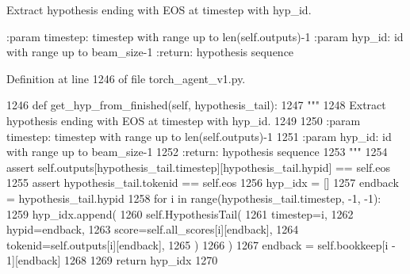 \begin{DoxyVerb}Extract hypothesis ending with EOS at timestep with hyp_id.

:param timestep: timestep with range up to len(self.outputs)-1
:param hyp_id: id with range up to beam_size-1
:return: hypothesis sequence
\end{DoxyVerb}
 

Definition at line 1246 of file torch\+\_\+agent\+\_\+v1.\+py.


\begin{DoxyCode}
1246     \textcolor{keyword}{def }get\_hyp\_from\_finished(self, hypothesis\_tail):
1247         \textcolor{stringliteral}{"""}
1248 \textcolor{stringliteral}{        Extract hypothesis ending with EOS at timestep with hyp\_id.}
1249 \textcolor{stringliteral}{}
1250 \textcolor{stringliteral}{        :param timestep: timestep with range up to len(self.outputs)-1}
1251 \textcolor{stringliteral}{        :param hyp\_id: id with range up to beam\_size-1}
1252 \textcolor{stringliteral}{        :return: hypothesis sequence}
1253 \textcolor{stringliteral}{        """}
1254         \textcolor{keyword}{assert} self.outputs[hypothesis\_tail.timestep][hypothesis\_tail.hypid] == self.eos
1255         \textcolor{keyword}{assert} hypothesis\_tail.tokenid == self.eos
1256         hyp\_idx = []
1257         endback = hypothesis\_tail.hypid
1258         \textcolor{keywordflow}{for} i \textcolor{keywordflow}{in} range(hypothesis\_tail.timestep, -1, -1):
1259             hyp\_idx.append(
1260                 self.HypothesisTail(
1261                     timestep=i,
1262                     hypid=endback,
1263                     score=self.all\_scores[i][endback],
1264                     tokenid=self.outputs[i][endback],
1265                 )
1266             )
1267             endback = self.bookkeep[i - 1][endback]
1268 
1269         \textcolor{keywordflow}{return} hyp\_idx
1270 
\end{DoxyCode}
\mbox{\label{classparlai_1_1agents_1_1legacy__agents_1_1seq2seq_1_1torch__agent__v1_1_1Beam_a4f7299716e2ca82b0f8759ea11fec60a}} 

